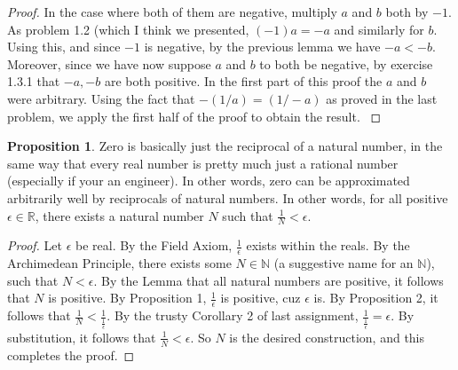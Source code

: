 \documentclass[11pt]{article}
\newcommand{\R}{\mathbb{R}}
\newcommand{\N}{\mathbb{N}}
\newcommand{\recip}[1]{\frac{1}{#1}}
\theoremstyle{definition}
\newtheorem{proposition}{Proposition}
\begin{document}
\begin{proof}
{\color{red} 
In the case where both of them are negative, multiply $a$ and $b$ both by $-1$. As problem 1.2 (which I think we presented, $(-1)a = -a$ and similarly for $b$. Using this, and since $-1$ is negative, by the previous lemma we have $-a < -b $. Moreover, since we have now suppose $a$ and $b$ to both be negative, by exercise 1.3.1 that $-a, -b$ are both positive. In the first part of this proof the $a$ and $b$ were arbitrary. Using the fact that $-(1/a) = (1/-a)$ as proved in the last problem, we apply the first half of the proof to obtain the result.
}

\end{proof}


\begin{proposition}
Zero is basically just the reciprocal of a natural number, in the same way that every real number is pretty much just a rational number (especially if your an engineer). In other words, zero can be approximated arbitrarily well by reciprocals of natural numbers. In other words, for all positive $\epsilon\in \R$, there exists a natural number $N$ such that $\recip{N} < \epsilon$.

\end{proposition}

\begin{proof}
{\color{red}Let $\epsilon$ be real.} By the Field Axiom, $\recip{\epsilon}$ exists within the reals. By the Archimedean Principle, there exists some $N \in \N$ (a suggestive name for an $\N$), such that $N < \epsilon$. {\color{red}By the Lemma that all natural numbers are positive, it follows that $N$ is positive.} By Proposition 1, $\recip{\epsilon}$ is positive, cuz $\epsilon$ is. By Proposition 2, it follows that $\recip{N} < \recip{\recip{\epsilon}}$. By the trusty Corollary 2 of last assignment, $\recip{\recip{\epsilon}} = \epsilon$. By substitution, it follows that $\recip{N} < \epsilon$. So $N$ is the desired construction, and this completes the proof.

\end{proof}
\end{document}
